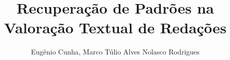 \title{Recuperação de Padrões na Valoração Textual de Redações}

\author{Eugênio Cunha, Marco Túlio Alves Nolasco Rodrigues}

\address{Universidade de Itaúna (UIT)\\
  Caixa Postal 100 -- 35.680-142 -- Itaúna -- MG -- Brasil
}